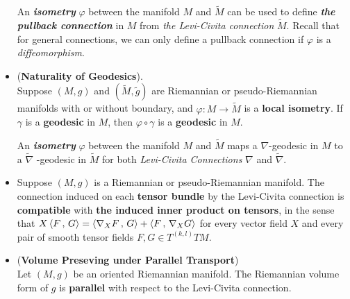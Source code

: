 \documentclass[11pt]{article}
\begin{document}
\begin{itemize}
\begin{remark} 
An \emph{\textbf{isometry}} $\varphi$ between the manifold $M$ and $ \widetilde{M}$ can be used to define \emph{\textbf{the pullback connection}} in $M$ from \emph{the  Levi-Civita connection} $\widetilde{M}$. Recall that for general connections, we can only define a pullback connection if $\varphi$ is a \emph{diffeomorphism}.
\end{remark}

\item \begin{corollary} (\textbf{Naturality of Geodesics}). \\
Suppose $(M,g)$ and $(\widetilde{M}, \widetilde{g})$ are Riemannian or pseudo-Riemannian manifolds with or without boundary, and $\varphi: M \rightarrow \widetilde{M}$ is a \textbf{local isometry}. If $\gamma$ is a \textbf{geodesic} in $M$, then $\varphi \circ \gamma$ is a \textbf{geodesic} in $M$.
\end{corollary}

\begin{remark} 
An \emph{\textbf{isometry}} $\varphi$ between the manifold $M$ and $ \widetilde{M}$ maps a $\nabla$-geodesic in $M$ to a $\widetilde{\nabla}$ -geodesic in $\widetilde{M}$ for both \emph{Levi-Civita Connections} $\nabla$ and $\widetilde{\nabla}$.
\end{remark}

\item \begin{proposition}
Suppose $(M,g)$ is a Riemannian or pseudo-Riemannian manifold. The connection induced on each \textbf{tensor bundle} by the Levi-Civita connection is \textbf{compatible} with \textbf{the induced inner product on tensors}, in the sense that $X \left\langle F\,,\, G \right\rangle= \left\langle \nabla_{X}{F}\,,\, G \right\rangle + \left\langle F\,,\, \nabla_{X}{G} \right\rangle$ for every vector field $X$ and every pair of smooth tensor fields $F, G \in T^{(k,l)}TM$.
\end{proposition}

\item \begin{proposition} (\textbf{Volume Preseving under Parallel Transport})\\
Let $(M, g)$ be an oriented Riemannian manifold. The Riemannian volume form of $g$ is \textbf{parallel} with respect to the Levi-Civita connection.
\end{proposition}


\end{itemize}
\end{document}
